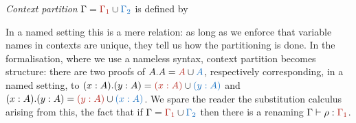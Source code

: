 \documentclass[a4paper,UKenglish,cleveref, autoref, thm-restate]{lipics-v2021}
\begin{document}
\begin{definition}
  \emph{Context partition} \(\Gamma = \part{\Gamma_{1}}{\Gamma_{2}}\)
  is defined by
\end{definition}

In a named setting this is a mere relation: as long as we enforce that variable
names in contexts are unique, they tell us how the partitioning is done.
In the formalisation, where we use a nameless syntax, context partition becomes
structure: there are two proofs of \(A.A = \part{A}{A}\), respectively corresponding,
in a named setting, to \((x:A).(y:A) = \part{(x:A)}{(y:A)}\) and
\((x:A).(y:A) = \part{(y:A)}{(x:A)}\). We spare the reader the substitution
calculus arising from this, \eg the fact that if \(\Gamma = \part{\Gamma_1}{\Gamma_2}\)
then there is a renaming \(\typing{\Gamma}{\rho}[\scol{\Gamma_1}]\).
\end{document}
